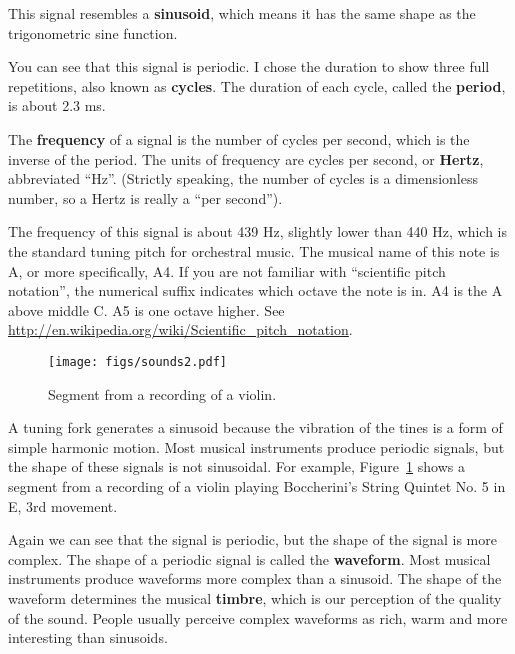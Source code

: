 This signal resembles a {\bf sinusoid}, which means it has the same
shape as the trigonometric sine function.

You can see that this signal is periodic.  I chose the duration
to show three full repetitions, also known as {\bf cycles}.
The duration of each cycle, called the {\bf period}, is about 2.3 ms.

The {\bf frequency} of a signal is the number of cycles
per second, which is the inverse of the period.
The units of frequency are cycles per second, or {\bf Hertz},
abbreviated ``Hz''.  (Strictly speaking, the number of cycles is
a dimensionless number, so a Hertz is really a ``per second'').

The frequency of this signal is about 439 Hz, slightly lower than 440
Hz, which is the standard tuning pitch for orchestral music.  The
musical name of this note is A, or more specifically, A4.  If you are
not familiar with ``scientific pitch notation'', the numerical suffix
indicates which octave the note is in.  A4 is the A above middle C.
A5 is one octave higher.  See
\url{http://en.wikipedia.org/wiki/Scientific_pitch_notation}.

\begin{figure}
	\centerline{\texttt{[image: figs/sounds2.pdf]}}
	\caption{Segment from a recording of a violin.}
	\label{fig.sounds2}
\end{figure}

A tuning fork generates a sinusoid because the vibration of the tines
is a form of simple harmonic motion.  Most musical instruments
produce periodic signals, but the shape of these signals is not
sinusoidal.  For example, Figure~\ref{fig.sounds2} shows a segment
from a recording of a violin playing
Boccherini's String Quintet No. 5 in E, 3rd
movement.


Again we can see that the signal is periodic, but the shape of the
signal is more complex.  The shape of a periodic signal is called
the {\bf waveform}.  Most musical instruments produce waveforms more
complex than a sinusoid.  The shape of the waveform determines the
musical {\bf timbre}, which is our perception of the quality of the
sound.  People usually perceive complex waveforms as rich, warm and
more interesting than sinusoids.


